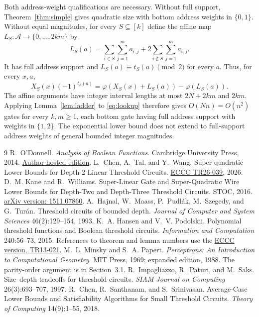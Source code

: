 \documentclass[11pt]{article}
\begin{document}
Both address-weight qualifications are necessary.
Without full support, Theorem~\ref{thm:simple} gives quadratic size with
bottom address weights in $\{0,1\}$.
Without equal magnitudes, for every $S\subseteq[k]$ define the affine map
$L_S:\mathcal A\to\{0,\ldots,2km\}$ by
$$L_S(a)=\sum_{i\in S}\sum_{j=1}^m a_{i,j}
          +2\sum_{i\notin S}\sum_{j=1}^m a_{i,j}.$$
It has full address support and $L_S(a)\equiv t_S(a)\pmod2$ for every $a$.
Thus, for every $x,a$,
$$X_S(x)(-1)^{t_S(a)}
 =\varphi(X_S(x)+L_S(a))-\varphi(L_S(a)).$$
The affine arguments have integer interval lengths at most $2N+2km$
and $2km$. Applying Lemma~\ref{lem:ladder} to \eqref{eq:lookup} therefore
gives $O(Nn)=O(n^2)$ gates for every $k,m\ge1$, each bottom gate having
full address support with weights in $\{1,2\}$.
The exponential lower bound does not extend to full-support address
weights of general bounded integer magnitudes.

\begin{thebibliography}{9}\small
{} R.~O'Donnell. \emph{Analysis of Boolean Functions}.
Cambridge University Press, 2014.
\href{https://www.cs.cmu.edu/~odonnell/papers/Analysis-of-Boolean-Functions-by-Ryan-ODonnell.pdf}{Author-hosted edition}.
 L.~Chen, A.~Tal, and Y.~Wang.
Super-quadratic Lower Bounds for Depth-2 Linear Threshold Circuits.
\href{https://eccc.weizmann.ac.il/report/2026/039/}{ECCC TR26-039}, 2026.
 D.~M. Kane and R.~Williams.
Super-Linear Gate and Super-Quadratic Wire Lower Bounds for Depth-Two and
Depth-Three Threshold Circuits. STOC, 2016.
\href{https://arxiv.org/abs/1511.07860}{arXiv version: 1511.07860}.
 A.~Hajnal, W.~Maass, P.~Pudl\'ak, M.~Szegedy, and G.~Tur\'an.
Threshold circuits of bounded depth.
\emph{Journal of Computer and System Sciences} 46(2):129--154, 1993.
 K.~A. Hansen and V.~V. Podolskii.
Polynomial threshold functions and Boolean threshold circuits.
\emph{Information and Computation} 240:56--73, 2015.
References to theorem and lemma numbers use the
\href{https://eccc.weizmann.ac.il/report/2013/021/download/}{ECCC version, TR13-021}.
 M.~L. Minsky and S.~A. Papert.
\emph{Perceptrons: An Introduction to Computational Geometry}.
MIT Press, 1969; expanded edition, 1988. The parity-order argument is in
Section~3.1.
 R.~Impagliazzo, R.~Paturi, and M.~Saks.
Size--depth tradeoffs for threshold circuits.
\emph{SIAM Journal on Computing} 26(3):693--707, 1997.
 R.~Chen, R.~Santhanam, and S.~Srinivasan.
Average-Case Lower Bounds and Satisfiability Algorithms for Small Threshold
Circuits. \emph{Theory of Computing} 14(9):1--55, 2018.
\end{thebibliography}
\end{document}
